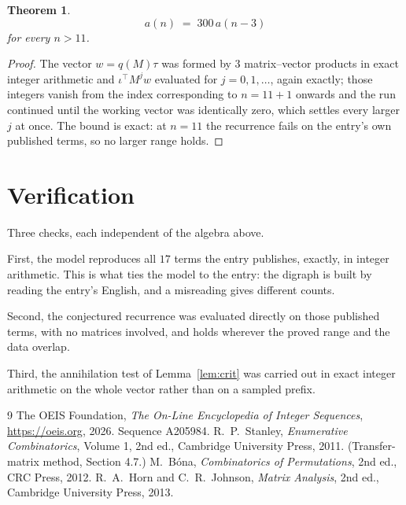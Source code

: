 \documentclass[11pt,a4paper]{article}
\theoremstyle{plain}
\newtheorem{theorem}{Theorem}
\theoremstyle{definition}
\begin{document}
\begin{theorem}
\[
a(n)\;=\;300\,a(n-3)
\]
for every $n>11$.
\end{theorem}

\begin{proof}
The vector $w=q(M)\tau$ was formed by $3$ matrix--vector products in exact integer
arithmetic and $\iota^{\!\top}M^{j}w$ evaluated for $j=0,1,\dots$, again exactly; those
integers vanish from the index corresponding to $n=11+1$ onwards and the run continued
until the working vector was identically zero, which settles every larger $j$ at once. The bound is exact: at $n=11$ the recurrence fails on the entry's own published terms, so no larger range holds.
\end{proof}

\section{Verification}

Three checks, each independent of the algebra above.

First, the model reproduces all $17$ terms the entry publishes, exactly, in integer
arithmetic. This is what ties the model to the entry: the digraph is built by reading the
entry's English, and a misreading gives different counts.

Second, the conjectured recurrence was evaluated directly on those published terms, with no
matrices involved, and holds wherever the proved range and the data overlap.

Third, the annihilation test of Lemma~\ref{lem:crit} was carried out in exact integer
arithmetic on the whole vector rather than on a sampled prefix.

\begin{thebibliography}{9}
 The OEIS Foundation, \emph{The On-Line Encyclopedia of Integer
Sequences}, \url{https://oeis.org}, 2026. Sequence A205984.
 R.~P.~Stanley, \emph{Enumerative Combinatorics}, Volume 1, 2nd ed.,
Cambridge University Press, 2011. (Transfer-matrix method, Section 4.7.)
 M.~B\'ona, \emph{Combinatorics of Permutations}, 2nd ed., CRC
Press, 2012.
 R.~A.~Horn and C.~R.~Johnson, \emph{Matrix Analysis}, 2nd ed., Cambridge
University Press, 2013.
\end{thebibliography}
\end{document}
